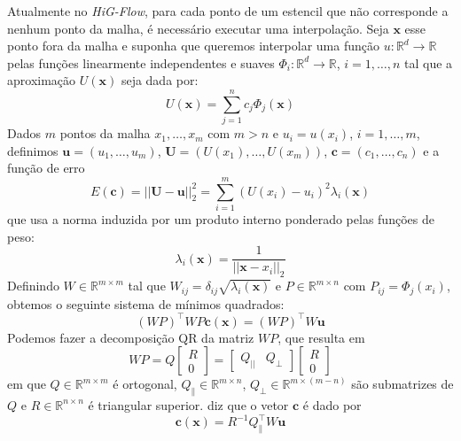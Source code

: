 \documentclass[
	12pt,				%
	oneside,			%
	a4paper,			%
	english,			%
	brazilian,				%
	]{article}
\begin{document}
	Atualmente no \textit{HiG-Flow}, para cada ponto de um estencil que não corresponde a nenhum ponto da malha, é necessário executar uma interpolação. Seja $\mathbf{x}$ esse ponto fora da malha e suponha que queremos interpolar uma função $u:\mathbb{R}^d \to \mathbb{R}$ pelas funções linearmente independentes e suaves $\Phi_i:\mathbb{R}^d \to \mathbb{R}$, $i=1, \dots, n$ tal que a aproximação $U(\mathbf{x})$ seja dada por:
	\begin{equation}
		U(\mathbf{x}) = \sum_{j=1}^{n}c_j\Phi_j(\mathbf{x})
	\end{equation}
	Dados $m$ pontos da malha $x_1, \dots, x_m$ com $m > n$ e $u_i = u(x_i)$, $i=1,\dots,m$, definimos $\mathbf{u} = (u_1, \dots, u_m)$, $\mathbf{U} = (U(x_1), \dots, U(x_m))$, $\mathbf{c} = (c_1, \dots, c_n)$ e a função de erro
	\begin{equation}
		E(\mathbf{c}) = ||\mathbf{U} - \mathbf{u}||^2_2 = \sum_{i=1}^{m}(U(x_i) - u_i)^2 \lambda_i(\mathbf{x})
	\end{equation}
	que usa a norma induzida por um produto interno ponderado pelas funções de peso:
	\begin{equation}
		\lambda_i(\mathbf{x}) = \frac{1}{||\mathbf{x} - x_i||_2}
	\end{equation}
	Definindo $W \in \mathbb{R}^{m\times m}$ tal que $W_{ij} = \delta_{ij}\sqrt{\lambda_i(\mathbf{x})}$ e $P \in \mathbb{R}^{m\times n}$ com $P_{ij} = \Phi_j(x_i)$, obtemos o seguinte sistema de mínimos quadrados:
	\begin{equation}
		(WP)^\top WP\mathbf{c}(\mathbf{x}) = (WP)^\top W\mathbf{u}
	\end{equation}
	Podemos fazer a decomposição QR da matriz $WP$, que resulta em
	\begin{equation}
		WP = Q
		\begin{bmatrix}
			R \\ 0
		\end{bmatrix} = 
		\begin{bmatrix}
			Q_{||} & Q_\perp
		\end{bmatrix}
		\begin{bmatrix}
			R \\ 0
		\end{bmatrix}
	\end{equation}
	em que $Q \in \mathbb{R}^{m\times m}$ é ortogonal, $Q_{\parallel} \in \mathbb{R}^{m\times n}$, $Q_\perp \in \mathbb{R}^{m\times (m-n)}$ são submatrizes de $Q$ e $R \in \mathbb{R}^{n\times n}$ é triangular superior. \cite{Sousa2019} diz que o vetor $\mathbf{c}$ é dado por
	\begin{equation}
		\mathbf{c}(\mathbf{x}) = R^{-1} Q^\top_{\parallel} W \mathbf{u}
	\end{equation}
\end{document}
